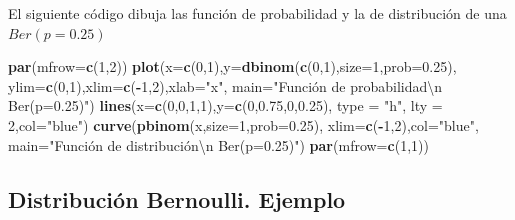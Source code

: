 \documentclass[]{book}
\newenvironment{Shaded}{\begin{snugshade}}{\end{snugshade}}
\newcommand{\CharTok}[1]{\textcolor[rgb]{0.31,0.60,0.02}{#1}}
\newcommand{\DataTypeTok}[1]{\textcolor[rgb]{0.13,0.29,0.53}{#1}}
\newcommand{\DecValTok}[1]{\textcolor[rgb]{0.00,0.00,0.81}{#1}}
\newcommand{\FloatTok}[1]{\textcolor[rgb]{0.00,0.00,0.81}{#1}}
\newcommand{\KeywordTok}[1]{\textcolor[rgb]{0.13,0.29,0.53}{\textbf{#1}}}
\newcommand{\NormalTok}[1]{#1}
\newcommand{\OperatorTok}[1]{\textcolor[rgb]{0.81,0.36,0.00}{\textbf{#1}}}
\newcommand{\StringTok}[1]{\textcolor[rgb]{0.31,0.60,0.02}{#1}}
\begin{document}
El siguiente código dibuja las función de probabilidad y la de distribución de una \(Ber(p=0.25)\)

\begin{Shaded}
\begin{Highlighting}[]
\KeywordTok{par}\NormalTok{(}\DataTypeTok{mfrow=}\KeywordTok{c}\NormalTok{(}\DecValTok{1}\NormalTok{,}\DecValTok{2}\NormalTok{))}
\KeywordTok{plot}\NormalTok{(}\DataTypeTok{x=}\KeywordTok{c}\NormalTok{(}\DecValTok{0}\NormalTok{,}\DecValTok{1}\NormalTok{),}\DataTypeTok{y=}\KeywordTok{dbinom}\NormalTok{(}\KeywordTok{c}\NormalTok{(}\DecValTok{0}\NormalTok{,}\DecValTok{1}\NormalTok{),}\DataTypeTok{size=}\DecValTok{1}\NormalTok{,}\DataTypeTok{prob=}\FloatTok{0.25}\NormalTok{),}
     \DataTypeTok{ylim=}\KeywordTok{c}\NormalTok{(}\DecValTok{0}\NormalTok{,}\DecValTok{1}\NormalTok{),}\DataTypeTok{xlim=}\KeywordTok{c}\NormalTok{(}\OperatorTok{-}\DecValTok{1}\NormalTok{,}\DecValTok{2}\NormalTok{),}\DataTypeTok{xlab=}\StringTok{"x"}\NormalTok{,}
     \DataTypeTok{main=}\StringTok{"Función de probabilidad}\CharTok{\textbackslash{}n}\StringTok{ Ber(p=0.25)"}\NormalTok{)}
\KeywordTok{lines}\NormalTok{(}\DataTypeTok{x=}\KeywordTok{c}\NormalTok{(}\DecValTok{0}\NormalTok{,}\DecValTok{0}\NormalTok{,}\DecValTok{1}\NormalTok{,}\DecValTok{1}\NormalTok{),}\DataTypeTok{y=}\KeywordTok{c}\NormalTok{(}\DecValTok{0}\NormalTok{,}\FloatTok{0.75}\NormalTok{,}\DecValTok{0}\NormalTok{,}\FloatTok{0.25}\NormalTok{), }\DataTypeTok{type =} \StringTok{"h"}\NormalTok{, }\DataTypeTok{lty =} \DecValTok{2}\NormalTok{,}\DataTypeTok{col=}\StringTok{"blue"}\NormalTok{)}
\KeywordTok{curve}\NormalTok{(}\KeywordTok{pbinom}\NormalTok{(x,}\DataTypeTok{size=}\DecValTok{1}\NormalTok{,}\DataTypeTok{prob=}\FloatTok{0.25}\NormalTok{),}
      \DataTypeTok{xlim=}\KeywordTok{c}\NormalTok{(}\OperatorTok{-}\DecValTok{1}\NormalTok{,}\DecValTok{2}\NormalTok{),}\DataTypeTok{col=}\StringTok{"blue"}\NormalTok{,}
      \DataTypeTok{main=}\StringTok{"Función de distribución\textbackslash{}n Ber(p=0.25)"}\NormalTok{)}
\KeywordTok{par}\NormalTok{(}\DataTypeTok{mfrow=}\KeywordTok{c}\NormalTok{(}\DecValTok{1}\NormalTok{,}\DecValTok{1}\NormalTok{))}
\end{Highlighting}
\end{Shaded}

\hypertarget{distribuciuxf3n-bernoulli.-ejemplo-2}{%
\subsection{Distribución Bernoulli. Ejemplo}\label{distribuciuxf3n-bernoulli.-ejemplo-2}}
\end{document}
